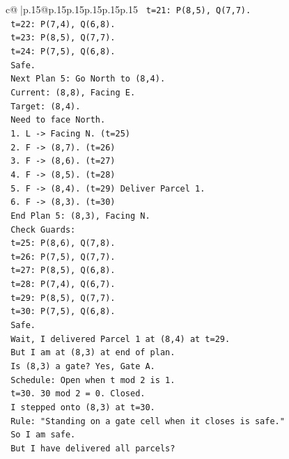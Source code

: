 \documentclass{article}
\begin{document}
{\begin{supertabular}{c@{$\;$}|p{.15\linewidth}@{}p{.15\linewidth}p{.15\linewidth}p{.15\linewidth}p{.15\linewidth}p{.15\linewidth}}
{{{\texttt{   t=21: P(8,5), Q(7,7).} \\
\texttt{   t=22: P(7,4), Q(6,8).} \\
\texttt{   t=23: P(8,5), Q(7,7).} \\
\texttt{   t=24: P(7,5), Q(6,8).} \\
\texttt{   Safe.} \\
\texttt{   Next Plan 5: Go North to (8,4).} \\
\texttt{   Current: (8,8), Facing E.} \\
\texttt{   Target: (8,4).} \\
\texttt{   Need to face North.} \\
\texttt{   1. L {-}> Facing N. (t=25)} \\
\texttt{   2. F {-}> (8,7). (t=26)} \\
\texttt{   3. F {-}> (8,6). (t=27)} \\
\texttt{   4. F {-}> (8,5). (t=28)} \\
\texttt{   5. F {-}> (8,4). (t=29) Deliver Parcel 1.} \\
\texttt{   6. F {-}> (8,3). (t=30)} \\
\texttt{   End Plan 5: (8,3), Facing N.} \\
\texttt{   Check Guards:} \\
\texttt{   t=25: P(8,6), Q(7,8).} \\
\texttt{   t=26: P(7,5), Q(7,7).} \\
\texttt{   t=27: P(8,5), Q(6,8).} \\
\texttt{   t=28: P(7,4), Q(6,7).} \\
\texttt{   t=29: P(8,5), Q(7,7).} \\
\texttt{   t=30: P(7,5), Q(6,8).} \\
\texttt{   Safe.} \\
\texttt{   Wait, I delivered Parcel 1 at (8,4) at t=29.} \\
\texttt{   But I am at (8,3) at end of plan.} \\
\texttt{   Is (8,3) a gate? Yes, Gate A.} \\
\texttt{   Schedule: Open when t mod 2 is 1.} \\
\texttt{   t=30. 30 mod 2 = 0. Closed.} \\
\texttt{   I stepped onto (8,3) at t=30.} \\
\texttt{   Rule: "Standing on a gate cell when it closes is safe."} \\
\texttt{   So I am safe.} \\
\texttt{   But I have delivered all parcels?} \\
}}}
\end{supertabular}}
\end{document}
